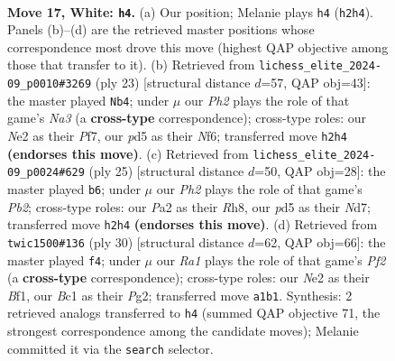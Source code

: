 \documentclass[11pt]{article}
\begin{document}
\clearpage

\begin{figure}[p]\centering
\begin{subfigure}{0.46\textwidth}\centering
\resizebox{\linewidth}{!}{%
\newchessgame
\chessboard[
  setfen={rnb1k2r/pp2bppp/4p3/3pPn2/5P2/3B2P1/P2NN2P/R1B1K2R w KQ - 3 17},
  showmover=false,
  pgfstyle=straightmove, color=movearrow, markmove={h2-h4}
]}
\caption{}
\end{subfigure}\hfill
\begin{subfigure}{0.46\textwidth}\centering
\resizebox{\linewidth}{!}{%
\newchessgame
\chessboard[
  setfen={r3k2r/1p2pp1p/n1p1bnp1/p7/P1N1P3/2N2P2/1PP3PP/2R1KB1R b kq - 0 12},
  showmover=false,
  pgfstyle=straightmove, color=movearrow, markmove={a6-b4}
]}
\caption{}
\end{subfigure}
\\[4pt]
\begin{subfigure}{0.46\textwidth}\centering
\resizebox{\linewidth}{!}{%
\newchessgame
\chessboard[
  setfen={r1b4r/1p1nkppp/p3p3/2bn4/3N4/1P2P3/P3BPPP/RNBR2K1 b - - 4 13},
  showmover=false,
  pgfstyle=straightmove, color=movearrow, markmove={b7-b6}
]}
\caption{}
\end{subfigure}\hfill
\begin{subfigure}{0.46\textwidth}\centering
\resizebox{\linewidth}{!}{%
\newchessgame
\chessboard[
  setfen={r1bk3r/p2pn1pp/1p3p2/1Nn1p3/2P1P3/B2P4/5PPP/1R2KB1R w K - 8 16},
  showmover=false,
  pgfstyle=straightmove, color=movearrow, markmove={f2-f4}
]}
\caption{}
\end{subfigure}
\caption{\textbf{Move 17, White: \texttt{h4}.} (a) Our position; Melanie plays \texttt{h4} (\texttt{h2h4}). Panels (b)--(d) are the retrieved master positions whose correspondence most drove this move (highest QAP objective among those that transfer to it). (b) Retrieved from \texttt{lichess\_elite\_2024-09\_p0010\#3269} (ply 23) [structural distance $d$=57, QAP obj=43]: the master played \texttt{Nb4}; under $\mu$ our \emph{Ph2} plays the role of that game's \emph{Na3} (a \textbf{cross-type} correspondence); cross-type roles: our \emph{N}e2 as their \emph{P}f7, our \emph{p}d5 as their \emph{N}f6; transferred move \texttt{h2h4} \textbf{(endorses this move)}. (c) Retrieved from \texttt{lichess\_elite\_2024-09\_p0024\#629} (ply 25) [structural distance $d$=50, QAP obj=28]: the master played \texttt{b6}; under $\mu$ our \emph{Ph2} plays the role of that game's \emph{Pb2}; cross-type roles: our \emph{P}a2 as their \emph{R}h8, our \emph{p}d5 as their \emph{N}d7; transferred move \texttt{h2h4} \textbf{(endorses this move)}. (d) Retrieved from \texttt{twic1500\#136} (ply 30) [structural distance $d$=62, QAP obj=66]: the master played \texttt{f4}; under $\mu$ our \emph{Ra1} plays the role of that game's \emph{Pf2} (a \textbf{cross-type} correspondence); cross-type roles: our \emph{N}e2 as their \emph{B}f1, our \emph{B}c1 as their \emph{P}g2; transferred move \texttt{a1b1}. Synthesis: 2 retrieved analogs transferred to \texttt{h4} (summed QAP objective 71, the strongest correspondence among the candidate moves); Melanie committed it via the \texttt{search} selector.}
\label{fig:thought-m32}
\end{figure}
\end{document}
